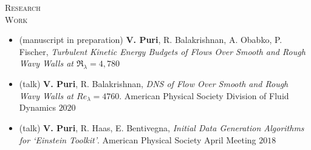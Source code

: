 \documentclass[10pt]{article}
\begin{document}
\vspace{-1.5em}
\begin{multicols}{2}
\textsc{Research \\ Work}
\columnbreak

\vspace{-1.75em}
\begin{itemize}[label= ]
    \setlength{\itemindent}{-2.5em}
    \setlength\itemsep{-0.25em}
    \item (manuscript in preparation) \textbf{V. Puri}, R. Balakrishnan, A. Obabko, P. Fischer, \textit{Turbulent Kinetic Energy Budgets of Flows Over Smooth and Rough Wavy Walls at $\Re_\lambda=4,780$}
    \item (talk) \textbf{V. Puri}, R. Balakrishnan, \textit{DNS of Flow Over Smooth and Rough Wavy Walls at $\mathit{Re}_\lambda=4760$}. American Physical Society Division of Fluid Dynamics $2020$
    \item (talk) \textbf{V. Puri}, R. Haas, E. Bentivegna, \textit{Initial Data Generation Algorithms for `Einstein Toolkit'}. American Physical Society April Meeting $2018$
\end{itemize}
\vspace{-2.0em}

\end{multicols}
\vspace{-1.5em}
\end{document}
